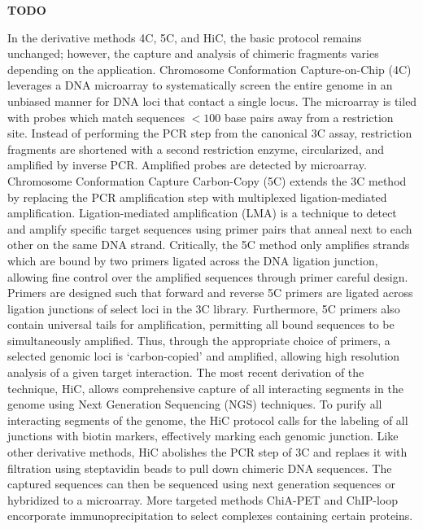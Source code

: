 \documentclass[phd,tocprelim]{cornell}
\begin{document}
\textbf{TODO}
%
%

In the derivative methods 4C, 5C, and HiC, the basic protocol remains
unchanged; however, the capture and analysis of chimeric fragments varies
depending on the application.  Chromosome Conformation Capture-on-Chip (4C)
leverages a DNA microarray to systematically screen the entire genome in an
unbiased manner for DNA loci that contact a single locus\cite{simonis2006}.
The microarray is tiled with probes which match sequences $< 100$ base pairs
away from a restriction site.  Instead of performing the PCR step from the
canonical 3C assay, restriction fragments are shortened with a second restriction
enzyme, circularized, and amplified by inverse PCR\@.  Amplified probes
are detected by microarray\cite{simonis2006}.  Chromosome Conformation Capture Carbon-Copy (5C)
extends the 3C method by replacing the PCR amplification step with multiplexed
ligation-mediated amplification.  Ligation-mediated amplification (LMA) is a
technique to detect and amplify specific target sequences using primer pairs
that anneal next to each other on the same DNA strand\cite{dostie2006}.
Critically, the 5C method only amplifies strands which are bound by two
primers ligated across the DNA ligation junction, allowing fine control over
the amplified sequences through primer careful design.  Primers are
designed such that forward and reverse 5C primers are ligated across ligation
junctions of select loci in the 3C library.
Furthermore, 5C primers also contain universal tails for amplification,
permitting all bound sequences to be simultaneously amplified.  Thus, through
the appropriate choice of primers, a selected genomic loci is `carbon-copied'
and amplified, allowing high resolution analysis of a given target
interaction\cite{dostie2006}.  The most recent derivation of the technique,
HiC, allows comprehensive capture of all interacting segments in the genome
using Next Generation Sequencing (NGS) techniques.  To purify all interacting
segments of the genome, the HiC protocol calls for the labeling of all junctions
with biotin markers, effectively marking each genomic junction. Like other
derivative methods, HiC abolishes the PCR step of 3C and replaes it with filtration
using steptavidin beads to pull down chimeric DNA sequences.  The captured sequences
can then be sequenced using next generation sequences or hybridized to a
microarray.  More targeted methods ChiA-PET and ChIP-loop encorporate
immunoprecipitation to select complexes containing certain proteins.
\end{document}
